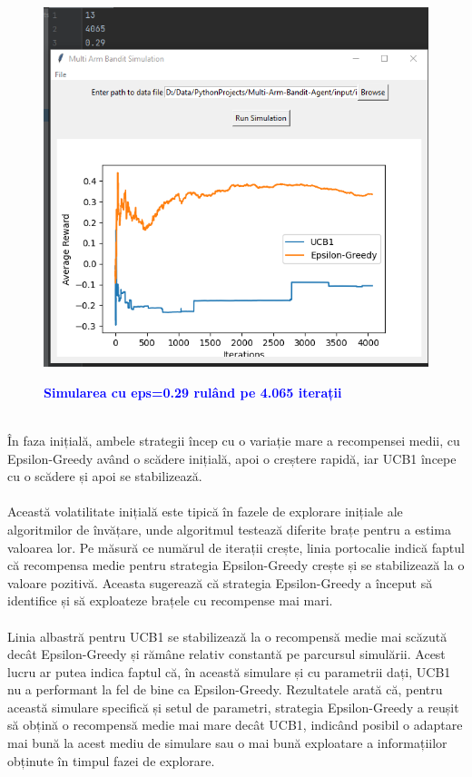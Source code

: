 \documentclass{article}
\begin{document}
\begin{figure}[h]
    \centering
    \includegraphics[width=0.95\linewidth]{plot generation 5.png}
    \bfseries\caption{\textcolor{blue}{\textbf{Simularea cu eps=0.29 rulând pe 4.065 iterații}}}
\end{figure}
\\În faza inițială, ambele strategii încep cu o variație mare a recompensei medii, cu Epsilon-Greedy având o scădere inițială, apoi o creștere rapidă, iar UCB1 începe cu o scădere și apoi se stabilizează. \\\\
Această volatilitate inițială este tipică în fazele de explorare inițiale ale algoritmilor de învățare, unde algoritmul testează diferite brațe pentru a estima valoarea lor.
Pe măsură ce numărul de iterații crește, linia portocalie indică faptul că recompensa medie pentru strategia Epsilon-Greedy crește și se stabilizează la o valoare pozitivă. 
Aceasta sugerează că strategia Epsilon-Greedy a început să identifice și să exploateze brațele cu recompense mai mari.\\\\
Linia albastră pentru UCB1 se stabilizează la o recompensă medie mai scăzută decât Epsilon-Greedy și rămâne relativ constantă pe parcursul simulării. Acest lucru ar putea indica faptul că, în această simulare și cu parametrii dați, UCB1 nu a performant la fel de bine ca Epsilon-Greedy. Rezultatele arată că, pentru această simulare specifică și setul de parametri, strategia Epsilon-Greedy a reușit să obțină o recompensă medie mai mare decât UCB1, indicând posibil o adaptare mai bună la acest mediu de simulare sau o mai bună exploatare a informațiilor obținute în timpul fazei de explorare.\\\\
\end{document}

